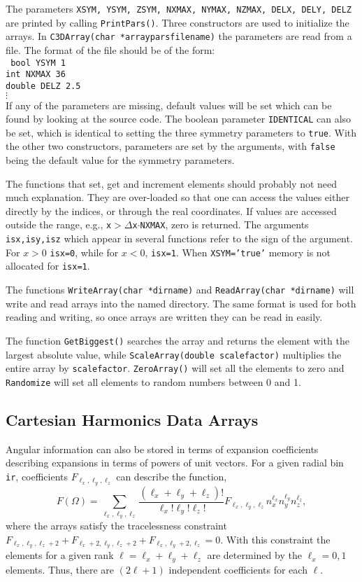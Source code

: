 \documentclass[10pt]{article}
\begin{document}
The parameters {\tt XSYM, YSYM, ZSYM, NXMAX, NYMAX, NZMAX, DELX, DELY, DELZ} are printed by calling {\tt PrintPars()}. Three constructors are used to initialize the arrays. In {\tt C3DArray(char *arrayparsfilename)} the parameters are read from a file. The format of the file should be of the form:\\
{\tt
bool YSYM 1\\
int NXMAX 36\\
double DELZ 2.5\\
$\vdots$\\
}
If any of the parameters are missing, default values will be set which can be found by looking at the source code. The boolean parameter {\tt IDENTICAL} can also be set, which is identical to setting the three symmetry parameters to {\tt true}. With the other two constructors, parameters are set by the arguments, with {\tt false} being the default value for the symmetry parameters.

The functions that set, get and increment elements should probably not need much explanation. They are over-loaded so that one can access the values either directly by the indices, or through the real coordinates. If values are accessed outside the range, e.g., {\tt x$>\Delta$x$\cdot$NXMAX}, zero is returned. The arguments {\tt isx,isy,isz} which appear in several functions refer to the sign of the argument. For $x>0$ {\tt isx=0}, while for $x<0$, {\tt isx=1}. When {\tt XSYM='true'} memory is not allocated for {\tt isx=1}.

The functions {\tt WriteArray(char *dirname)} and {\tt ReadArray(char *dirname)} will write and read arrays into the named directory. The same format is used for both reading and writing, so once arrays are written they can be read in easily.

The function {\tt GetBiggest()} searches the array and returns the element with the largest absolute value, while {\tt ScaleArray(double scalefactor)} multiplies the entire array by {\tt scalefactor}. {\tt ZeroArray()} will set all the elements to zero and {\tt Randomize} will set all elements to random numbers between 0 and 1.

\subsection{Cartesian Harmonics Data Arrays}

Angular information can also be stored in terms of expansion coefficients describing expansions in terms of powers of unit vectors. For a given radial bin {\tt ir}, coefficients $F_{\ell_x,\ell_y,\ell_z}$ can describe the function,
\begin{equation}
\label{eq:aexpansion}
F(\Omega)=\sum_{\ell_x,\ell_y,\ell_z} \frac{(\ell_x+\ell_y+\ell_z)!}
{\ell_x!\ell_y!\ell_z!} F_{\ell_x,\ell_y,\ell_z}
n_x^{\ell_x}n_y^{\ell_y}n_z^{\ell_z},
\end{equation}
where the arrays satisfy the tracelessness constraint $F_{\ell_x,\ell_y,\ell_z+2}+F_{\ell_x+2,\ell_y,\ell_z+2}+F_{\ell_x,\ell_y+2,\ell_z}=0$. With this constraint the elements for a given rank $\ell=\ell_x+\ell_y+\ell_z$ are determined by the $\ell_x=0,1$ elements. Thus, there are $(2\ell+1)$ independent coefficients for each $\ell$.
\end{document}
